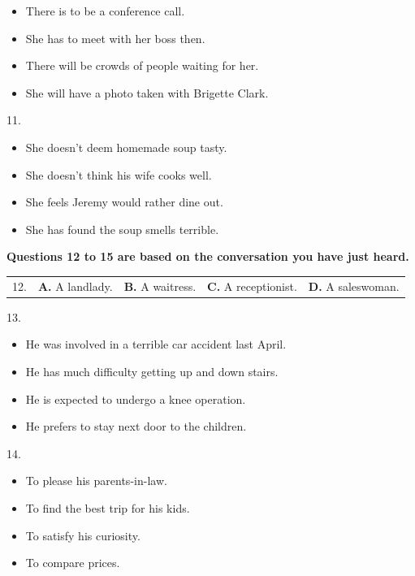 \documentclass[UTF8,11pt]{ctexart}
\begin{document}
\begin{itemize}[leftmargin=2em,itemsep=.2em,topsep=.4em]\item[A.] There is to be a conference call.
\item[B.] She has to meet with her boss then.
\item[C.] There will be crowds of people waiting for her.
\item[D.] She will have a photo taken with Brigette Clark.
\end{itemize}

11.


\begin{itemize}[leftmargin=2em,itemsep=.2em,topsep=.4em]\item[A.] She doesn’t deem homemade soup tasty.
\item[B.] She doesn’t think his wife cooks well.
\item[C.] She feels Jeremy would rather dine out.
\item[D.] She has found the soup smells terrible.
\end{itemize}

\textbf{Questions 12 to 15 are based on the conversation you have just heard.}


\noindent\begin{tabularx}{\linewidth}{@{}lXXXX@{}}12. & \textbf{A.} A landlady. & \textbf{B.} A waitress. & \textbf{C.} A receptionist. & \textbf{D.} A saleswoman.\\\end{tabularx}\par

13.


\begin{itemize}[leftmargin=2em,itemsep=.2em,topsep=.4em]\item[A.] He was involved in a terrible car accident last April.
\item[B.] He has much difficulty getting up and down stairs.
\item[C.] He is expected to undergo a knee operation.
\item[D.] He prefers to stay next door to the children.
\end{itemize}

14.


\begin{itemize}[leftmargin=2em,itemsep=.2em,topsep=.4em]\item[A.] To please his parents-in-law.
\item[B.] To find the best trip for his kids.
\item[C.] To satisfy his curiosity.
\item[D.] To compare prices.
\end{itemize}
\end{document}
